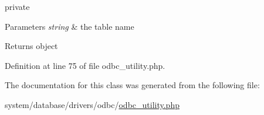 private 
\begin{DoxyParams}{Parameters}
{\em string} & the table name \\
\hline
\end{DoxyParams}
\begin{DoxyReturn}{Returns}
object 
\end{DoxyReturn}


Definition at line 75 of file odbc\-\_\-utility.\-php.



The documentation for this class was generated from the following file\-:\begin{DoxyCompactItemize}
\item 
system/database/drivers/odbc/\hyperlink{odbc__utility_8php}{odbc\-\_\-utility.\-php}\end{DoxyCompactItemize}
